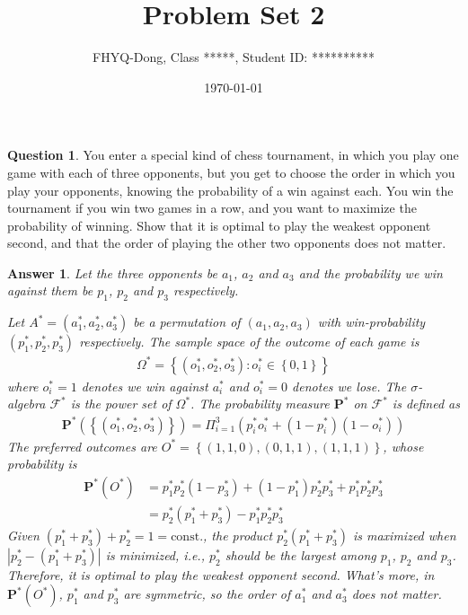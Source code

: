 \documentclass[utf8]{article}
\title{Problem Set 2}
\author{ FHYQ-Dong, Class *****, Student ID: ********** }
\date{\today}
\theoremstyle{definition}%
\newtheorem{question}{Question} %
\theoremstyle{plain}%
\newtheorem{answer}{Answer} %
\begin{document}
\maketitle
\thispagestyle{fancy}

\begin{question}
    You enter a special kind of chess tournament, in which you play one game with each of three opponents, but you get to choose the order in which you play your opponents, knowing the probability of a win against each. You win the tournament if you win two games in a row, and you want to maximize the probability of winning. Show that it is optimal to play the weakest opponent second, and that the order of playing the other two opponents does not matter.
\end{question}
\begin{answer}
    Let the three opponents be $a_1$, $a_2$ and $a_3$ and the probability we win against them be $p_1$, $p_2$ and $p_3$ respectively. 
    
    Let $A^* = \left(a^*_1, a^*_2, a^*_3\right)$ be a permutation of $\left(a_1, a_2, a_3\right)$ with win-probability $\left(p^*_1, p^*_2, p^*_3\right)$ respectively. The sample space of the outcome of each game is 
    \begin{align*}
        \Omega^* = \left\{\left(o^*_1, o^*_2, o^*_3\right) : o^*_i \in \left\{0, 1\right\}\right\}
    \end{align*}
    where $o^*_i = 1$ denotes we win against $a^*_i$ and $o^*_i = 0$ denotes we lose. The $\sigma$-algebra $\mathcal{F^*}$ is the power set of $\Omega^*$. The probability measure $\mathbf{P^*}$ on $\mathcal{F^*}$ is defined as 
    \begin{align*}
        \mathbf{P^*}\left(\left\{\left(o^*_1, o^*_2, o^*_3\right)\right\}\right) = \Pi_{i = 1}^{3} \left(p^*_i o^*_i + \left(1 - p^*_i\right) \left(1 - o^*_i\right)\right)
    \end{align*}
    The preferred outcomes are $O^* = \left\{\left(1, 1, 0\right), \left(0, 1, 1\right), \left(1, 1, 1\right)\right\}$, whose probability is
    \begin{align*}
        \mathbf{P^*}\left(O^*\right) &= p^*_1 p^*_2 \left(1 - p^*_3\right) + \left(1 - p^*_1\right) p^*_2 p^*_3 + p^*_1 p^*_2 p^*_3 \\
        &= p^*_2 \left(p^*_1 + p^*_3 \right) - p^*_1 p^*_2 p^*_3
    \end{align*}
    Given $\left(p^*_1 + p^*_3 \right) + p^*_2 = 1 = \mathrm{const.}$, the product $p^*_2 \left(p^*_1 + p^*_3 \right)$ is maximized when $| p^*_2 - \left(p^*_1 + p^*_3 \right) |$ is minimized, i.e., $p^*_2$ should be the largest among $p_1$, $p_2$ and $p_3$. Therefore, it is optimal to play the weakest opponent second. What's more, in $\mathbf{P^*}\left(O^*\right)$, $p^*_1$ and $p^*_3$ are symmetric, so the order of $a^*_1$ and $a^*_3$ does not matter.
\end{answer}
\end{document}
